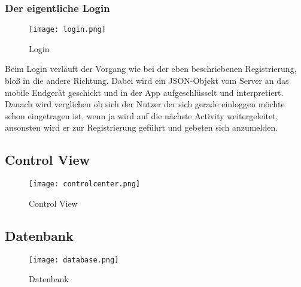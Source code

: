 \subsubsection{Der eigentliche Login}
\begin{figure}[h]
  \begin{center}
    \texttt{[image: login.png]}
  		  \caption{Login}
     \label{fig.Prozess}
  \end{center}
\end{figure}

Beim Login verläuft der Vorgang wie bei der eben beschriebenen Registrierung, bloß in die andere Richtung. Dabei wird ein JSON-Objekt vom Server an das mobile Endgerät geschickt und in der App aufgeschlüsselt und interpretiert. Danach wird verglichen ob sich der Nutzer der sich gerade einloggen möchte schon eingetragen ist, wenn ja wird auf die nächste Activity weitergeleitet, ansonsten wird er zur Registrierung geführt und gebeten sich anzumelden.
\subsection{Control View}
\begin{figure}[h]
  \begin{center}
    \texttt{[image: controlcenter.png]}
  		  \caption{Control View}
     \label{fig.Prozess}
  \end{center}
\end{figure}
\subsection{Datenbank}
\begin{figure}[h]
  \begin{center}
    \texttt{[image: database.png]}
  		  \caption{Datenbank}
     \label{fig.Prozess}
  \end{center}
\end{figure}